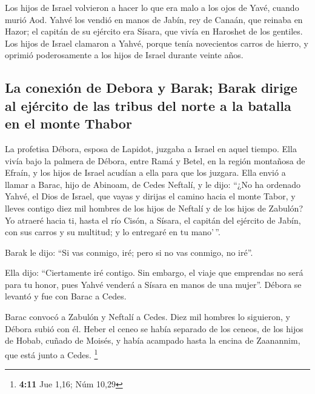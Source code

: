 \begin{paracol}{2}
 Los hijos de Israel volvieron a hacer lo que era malo a
los ojos de Yavé, cuando murió Aod.  Yahvé los vendió en
manos de Jabín, rey de Canaán, que reinaba en Hazor; el capitán de su
ejército era Sísara, que vivía en Haroshet de los gentiles.
 Los hijos de Israel clamaron a Yahvé, porque tenía
novecientos carros de hierro, y oprimió poderosamente a los hijos de
Israel durante veinte años.

\hypertarget{la-conexiuxf3n-de-debora-y-barak-barak-dirige-al-ejuxe9rcito-de-las-tribus-del-norte-a-la-batalla-en-el-monte-thabor}{%
\subsection{La conexión de Debora y Barak; Barak dirige al ejército de
las tribus del norte a la batalla en el monte
Thabor}\label{la-conexiuxf3n-de-debora-y-barak-barak-dirige-al-ejuxe9rcito-de-las-tribus-del-norte-a-la-batalla-en-el-monte-thabor}}

 La profetisa Débora, esposa de Lapidot, juzgaba a Israel
en aquel tiempo.  Ella vivía bajo la palmera de Débora,
entre Ramá y Betel, en la región montañosa de Efraín, y los hijos de
Israel acudían a ella para que los juzgara.  Ella envió a
llamar a Barac, hijo de Abinoam, de Cedes Neftalí, y le dijo: ``¿No ha
ordenado Yahvé, el Dios de Israel, que vayas y dirijas el camino hacia
el monte Tabor, y lleves contigo diez mil hombres de los hijos de
Neftalí y de los hijos de Zabulón?  Yo atraeré hacia ti,
hasta el río Cisón, a Sísara, el capitán del ejército de Jabín, con sus
carros y su multitud; y lo entregaré en tu mano'\,''.

 Barak le dijo: ``Si vas conmigo, iré; pero si no vas
conmigo, no iré''.

 Ella dijo: ``Ciertamente iré contigo. Sin embargo, el
viaje que emprendas no será para tu honor, pues Yahvé venderá a Sísara
en manos de una mujer''. Débora se levantó y fue con Barac a Cedes.

 Barac convocó a Zabulón y Neftalí a Cedes. Diez mil
hombres lo siguieron, y Débora subió con él.  Heber el
ceneo se había separado de los ceneos, de los hijos de Hobab, cuñado de
Moisés, y había acampado hasta la encina de Zaanannim, que está junto a
Cedes. \footnote{\textbf{4:11} Jue 1,16; Núm 10,29}

\hypertarget{la-derrota-y-el-asesinato-de-suxedsara-en-la-llanura-de-kison-la-terrible-hazauxf1a-de-jael}{%
}
\end{paracol}
